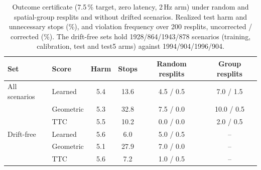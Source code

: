 \documentclass[lettersize,journal]{IEEEtran}
\begin{document}
\begin{table}[h]
\caption{Outcome certificate (7.5\,\% target, zero latency, 2\,Hz arm) under random and spatial-group resplits and without drifted scenarios. Realized test harm and unnecessary stops (\%), and violation frequency over 200 resplits, uncorrected / corrected (\%). The drift-free sets hold 1928/864/1943/878 scenarios (training, calibration, test and test5 arms) against 1994/904/1996/904.}
\label{tab:s-a14}
\centering
\scriptsize\setlength{\tabcolsep}{3pt}
\begin{tabular}{llcccc}
\toprule
Set & Score & Harm & Stops & Random resplits & Group resplits \\
\midrule
All scenarios & Learned & 5.4 & 13.6 & 4.5 / 0.5 & 7.0 / 1.5 \\
 & Geometric & 5.3 & 32.8 & 7.5 / 0.0 & 10.0 / 0.5 \\
 & TTC & 5.5 & 10.2 & 0.0 / 0.0 & 2.0 / 0.5 \\
\midrule
Drift-free & Learned & 5.6 & 6.0 & 5.0 / 0.5 & -- \\
 & Geometric & 5.1 & 27.9 & 7.0 / 0.0 & -- \\
 & TTC & 5.6 & 7.2 & 1.0 / 0.5 & -- \\
\bottomrule
\end{tabular}
\end{table}
\end{document}
